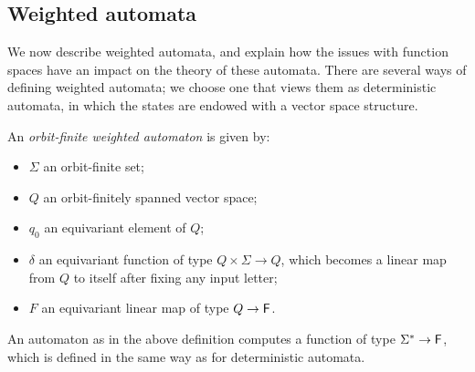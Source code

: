 

\subsection{Weighted automata} We now describe  weighted automata, and explain how the issues with function spaces have an impact on the theory of these automata. 
There are several ways of defining weighted automata; we choose one that  views them as deterministic automata, in which the states are endowed with a vector space structure.  
\begin{definition}\label{def:orbit-finite-weighted}
An \emph{orbit-finite weighted automaton} is given by: 
\begin{itemize}
    \item $\Sigma$ an orbit-finite set;
    \item $Q$   an orbit-finitely spanned vector space;
    \item $q_0$ an  equivariant element of $Q$;
    \item $\delta$ an equivariant function of type $Q \times \Sigma \to Q$, which becomes a linear map from $Q$ to itself after fixing any input letter;
    \item $F$  an equivariant linear map of type $Q \to \mathsf{F}$.
\end{itemize}
\end{definition}
An automaton as in the above definition computes a function of type $\Sigma^* \to \mathsf{F}$, which is defined in the same way as for deterministic automata. 

